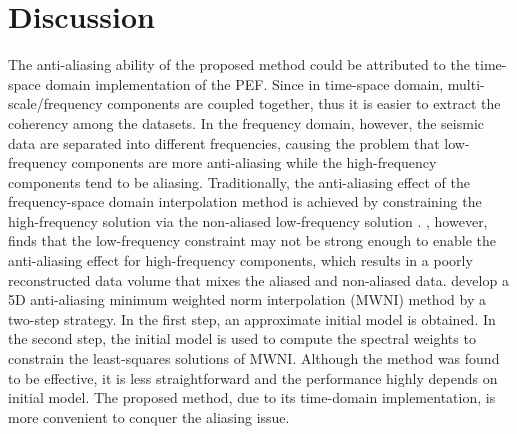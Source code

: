 {%
}

\section{Discussion}
The anti-aliasing ability of the proposed method could be attributed to the time-space domain implementation of the PEF. Since in time-space domain, multi-scale/frequency components are coupled together, thus it is easier to extract the coherency among the datasets. In the frequency domain, however, the seismic data are separated into different frequencies, causing the problem that low-frequency components are more anti-aliasing while the high-frequency components tend to be aliasing. Traditionally, the anti-aliasing effect of the frequency-space domain interpolation method is achieved by constraining the high-frequency solution via the non-aliased low-frequency solution \cite[]{herrmann2000aliased}. \cite{cary2011aliasing}, however, finds that the low-frequency constraint may not be strong enough to enable the anti-aliasing effect for high-frequency components, which results in a poorly reconstructed data volume that mixes the aliased and non-aliased data. \cite{chiu20135d} develop a 5D anti-aliasing minimum weighted norm interpolation (MWNI) method by a two-step strategy. In the first step, an approximate initial model is obtained. In the second step, the initial model is used to compute the spectral weights to constrain the least-squares solutions of MWNI. Although the method was found to be effective, it is less straightforward and the performance highly depends on initial model. The proposed method, due to its time-domain implementation, is more convenient to conquer the aliasing issue.

